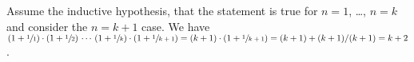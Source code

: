 \documentclass{ibl}  %
\begin{document}
\begin{problem}
\begin{exes}
\begin{answer}
  Assume the inductive hypothesis, that the statement is true for
  $n=1$, \ldots, $n=k$ and consider the $n=k+1$ case.
  We have
  $(1+\sfrac{1}{1})\cdot(1+\sfrac{1}{2})\,\cdots\,(1+\sfrac{1}{k})\cdot(1+\sfrac{1}{k+1})
  =
  (k+1)\cdot(1+\sfrac{1}{k+1})
  =(k+1)+(k+1)/(k+1)
  =k+2$.  
\end{answer}
\end{exes}



\end{problem}
\end{document}
